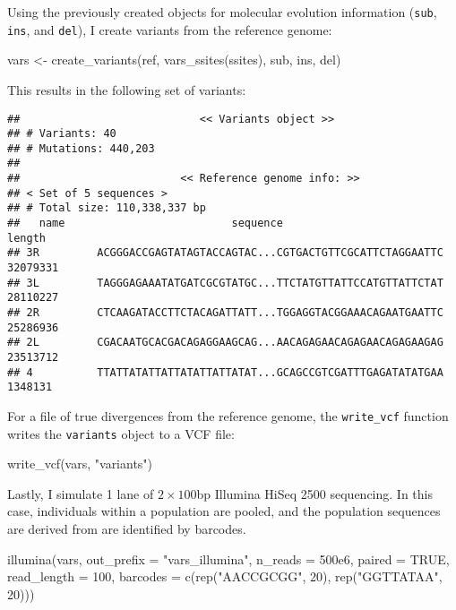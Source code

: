 \documentclass[12pt,]{article}
\newenvironment{Shaded}{}{}
\newcommand{\DataTypeTok}[1]{#1}
\newcommand{\DecValTok}[1]{#1}
\newcommand{\FloatTok}[1]{#1}
\newcommand{\KeywordTok}[1]{\textcolor[rgb]{0.00,0.00,1.00}{#1}}
\newcommand{\NormalTok}[1]{#1}
\newcommand{\OtherTok}[1]{\textcolor[rgb]{1.00,0.25,0.00}{#1}}
\newcommand{\StringTok}[1]{\textcolor[rgb]{0.00,0.50,0.50}{#1}}
\begin{document}
Using the previously created objects for molecular evolution information (\texttt{sub},
\texttt{ins}, and \texttt{del}), I create variants from the reference genome:

\begin{Shaded}
\begin{Highlighting}[]
\NormalTok{vars <-}\StringTok{ }\KeywordTok{create_variants}\NormalTok{(ref, }\KeywordTok{vars_ssites}\NormalTok{(ssites), sub, ins, del)}
\end{Highlighting}
\end{Shaded}

This results in the following set of variants:

\begin{verbatim}
##                            << Variants object >>
## # Variants: 40
## # Mutations: 440,203
## 
##                         << Reference genome info: >>
## < Set of 5 sequences >
## # Total size: 110,338,337 bp
##   name                          sequence                             length
## 3R         ACGGGACCGAGTATAGTACCAGTAC...CGTGACTGTTCGCATTCTAGGAATTC  32079331
## 3L         TAGGGAGAAATATGATCGCGTATGC...TTCTATGTTATTCCATGTTATTCTAT  28110227
## 2R         CTCAAGATACCTTCTACAGATTATT...TGGAGGTACGGAAACAGAATGAATTC  25286936
## 2L         CGACAATGCACGACAGAGGAAGCAG...AACAGAGAACAGAGAACAGAGAAGAG  23513712
## 4          TTATTATATTATTATATTATTATAT...GCAGCCGTCGATTTGAGATATATGAA   1348131
\end{verbatim}

For a file of true divergences from the reference genome, the \texttt{write\_vcf} function
writes the \texttt{variants} object to a VCF file:

\begin{Shaded}
\begin{Highlighting}[]
\KeywordTok{write_vcf}\NormalTok{(vars, }\StringTok{"variants"}\NormalTok{)}
\end{Highlighting}
\end{Shaded}

Lastly, I simulate 1 lane of \(2 \times 100\)bp Illumina HiSeq 2500 sequencing.
In this case, individuals within a population are pooled, and the population
sequences are derived from are identified by barcodes.

\begin{Shaded}
\begin{Highlighting}[]
\KeywordTok{illumina}\NormalTok{(vars, }\DataTypeTok{out_prefix =} \StringTok{"vars_illumina"}\NormalTok{, }\DataTypeTok{n_reads =} \FloatTok{500e6}\NormalTok{, }\DataTypeTok{paired =} \OtherTok{TRUE}\NormalTok{,}
         \DataTypeTok{read_length =} \DecValTok{100}\NormalTok{, }\DataTypeTok{barcodes =} \KeywordTok{c}\NormalTok{(}\KeywordTok{rep}\NormalTok{(}\StringTok{"AACCGCGG"}\NormalTok{, }\DecValTok{20}\NormalTok{), }
                                         \KeywordTok{rep}\NormalTok{(}\StringTok{"GGTTATAA"}\NormalTok{, }\DecValTok{20}\NormalTok{)))}
\end{Highlighting}
\end{Shaded}
\end{document}
